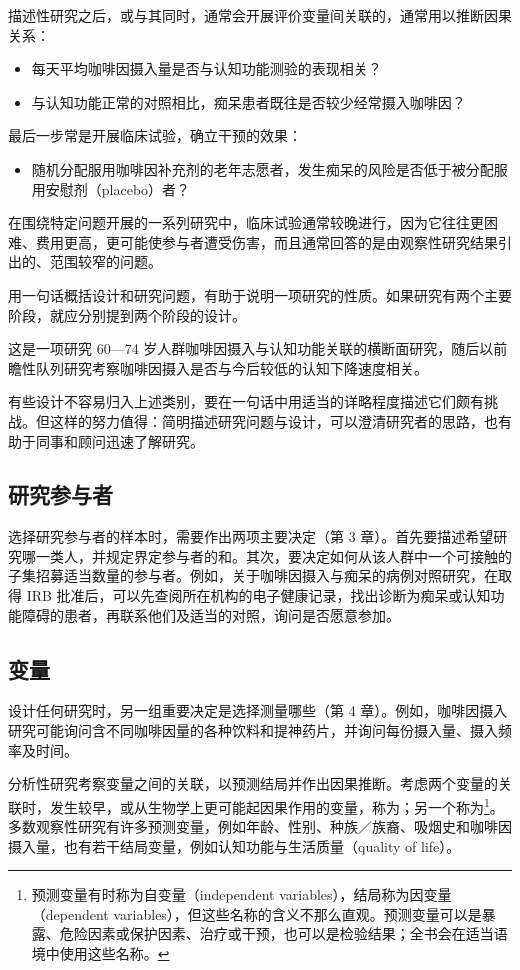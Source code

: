 描述性研究之后，或与其同时，通常会开展评价变量间关联的，通常用以推断因果关系：
\begin{itemize}
\item 每天平均咖啡因摄入量是否与认知功能测验的表现相关？
\item 与认知功能正常的对照相比，痴呆患者既往是否较少经常摄入咖啡因？
\end{itemize}
最后一步常是开展临床试验，确立干预的效果：
\begin{itemize}
\item 随机分配服用咖啡因补充剂的老年志愿者，发生痴呆的风险是否低于被分配服用安慰剂（placebo）者？
\end{itemize}
在围绕特定问题开展的一系列研究中，临床试验通常较晚进行，因为它往往更困难、费用更高，更可能使参与者遭受伤害，而且通常回答的是由观察性研究结果引出的、范围较窄的问题。

用一句话概括设计和研究问题，有助于说明一项研究的性质。如果研究有两个主要阶段，就应分别提到两个阶段的设计。
\begin{studyquote}
这是一项研究 60—74 岁人群咖啡因摄入与认知功能关联的横断面研究，随后以前瞻性队列研究考察咖啡因摄入是否与今后较低的认知下降速度相关。
\end{studyquote}
有些设计不容易归入上述类别，要在一句话中用适当的详略程度描述它们颇有挑战。但这样的努力值得：简明描述研究问题与设计，可以澄清研究者的思路，也有助于同事和顾问迅速了解研究。

\subsection{研究参与者}
选择研究参与者的样本时，需要作出两项主要决定（第 3 章）。首先要描述希望研究哪一类人，并规定界定参与者的和。其次，要决定如何从该人群中一个可接触的子集招募适当数量的参与者。例如，关于咖啡因摄入与痴呆的病例对照研究，在取得 IRB 批准后，可以先查阅所在机构的电子健康记录，找出诊断为痴呆或认知功能障碍的患者，再联系他们及适当的对照，询问是否愿意参加。

\subsection{变量}
设计任何研究时，另一组重要决定是选择测量哪些（第 4 章）。例如，咖啡因摄入研究可能询问含不同咖啡因量的各种饮料和提神药片，并询问每份摄入量、摄入频率及时间。

分析性研究考察变量之间的关联，以预测结局并作出因果推断。考虑两个变量的关联时，发生较早，或从生物学上更可能起因果作用的变量，称为；另一个称为\footnote{预测变量有时称为自变量（independent variables），结局称为因变量（dependent variables），但这些名称的含义不那么直观。预测变量可以是暴露、危险因素或保护因素、治疗或干预，也可以是检验结果；全书会在适当语境中使用这些名称。}。多数观察性研究有许多预测变量，例如年龄、性别、种族／族裔、吸烟史和咖啡因摄入量，也有若干结局变量，例如认知功能与生活质量（quality of life）。

